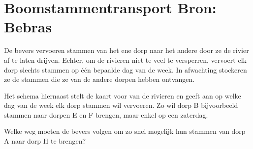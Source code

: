\documentclass[12pt, a4paper]{article}
\begin{document}
	\begin{minipage}{\textwidth}
		\section{Boomstammentransport \hfill\small Bron: Bebras}

			\begin{minipage}{0.6\linewidth}
				De bevers vervoeren stammen van het ene dorp naar het andere door ze de rivier af te laten drijven. Echter, om de rivieren niet te veel te versperren, vervoert elk dorp slechts stammen op één bepaalde dag van de week. In afwachting stockeren ze de stammen die ze van de andere dorpen hebben ontvangen.
				
				Het schema hiernaast stelt de kaart voor van de rivieren en geeft aan op welke dag van de week elk dorp stammen wil vervoeren. Zo wil dorp B bijvoorbeeld stammen naar dorpen E en F brengen, maar enkel op een zaterdag.
				
				Welke weg moeten de bevers volgen om zo snel mogelijk hun stammen van dorp A naar dorp H te brengen?
							

\end{minipage}
\end{minipage}
\end{document}

